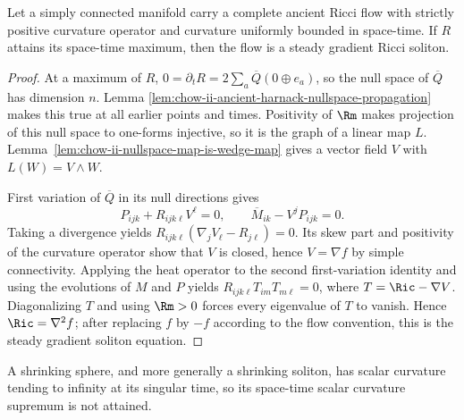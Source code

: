 \begin{theorem}
\label{thm:chow-ii-ancient-positive-curvature-maximizer-steady-soliton}
Let a simply connected manifold carry a complete ancient Ricci flow with
strictly positive curvature operator and curvature uniformly bounded in
space-time.  If \(R\) attains its space-time maximum, then the flow is a
steady gradient Ricci soliton.
\end{theorem}
\begin{proof}
\sketch At a maximum of \(R\),
\(0=\partial_tR=2\sum_a\overline Q(0\oplus e_a)\), so the null space of
\(\overline Q\) has dimension \(n\).  Lemma
\ref{lem:chow-ii-ancient-harnack-nullspace-propagation} makes this true at all
earlier points and times.  Positivity of \(\Rm\) makes projection of this null
space to one-forms injective, so it is the graph of a linear map \(L\).
Lemma~\ref{lem:chow-ii-nullspace-map-is-wedge-map} gives a vector field \(V\)
with \(L(W)=V\wedge W\).

First variation of \(\overline Q\) in its null directions gives
\[
P_{ijk}+R_{ijk\ell}V^\ell=0,
\qquad \overline M_{ik}-V^jP_{ijk}=0.
\]
Taking a divergence yields
\(R_{ijk\ell}(\nabla_jV_\ell-R_{j\ell})=0\).  Its skew part and positivity
of the curvature operator show that \(V\) is closed, hence \(V=\nabla f\) by
simple connectivity.  Applying the heat operator to the second first-variation
identity and using the evolutions of \(M\) and \(P\) yields
\(R_{ijk\ell}T_{im}T_{m\ell}=0\), where
\(T=\Ric-\nabla V\).  Diagonalizing \(T\) and using \(\Rm>0\) forces every
eigenvalue of \(T\) to vanish.  Hence \(\Ric=\nabla^2f\); after replacing
\(f\) by \(-f\) according to the flow convention, this is the steady gradient
soliton equation.
\end{proof}

\begin{remark}
\label{rem:chow-ii-shrinking-soliton-no-spacetime-r-maximum}
A shrinking sphere, and more generally a shrinking soliton, has scalar
curvature tending to infinity at its singular time, so its space-time scalar
curvature supremum is not attained.
\end{remark}

